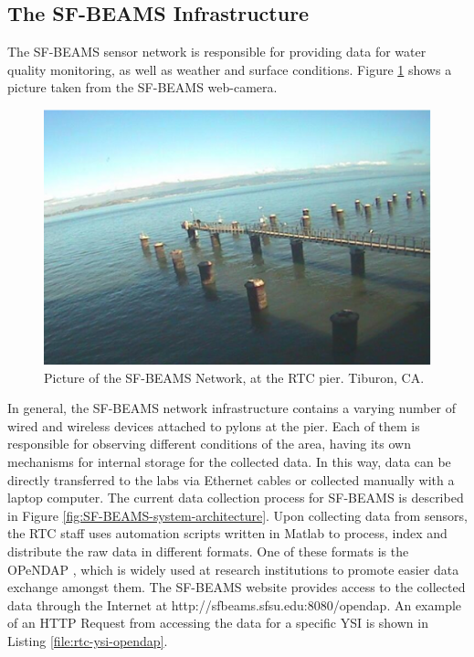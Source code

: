 \subsection{The SF-BEAMS Infrastructure}
\label{sec:sfbeams}

The SF-BEAMS sensor network is responsible for providing data for water quality
monitoring, as well as weather and surface conditions. Figure
\ref{fig:sf-beams} shows a picture taken from the SF-BEAMS web-camera.

\begin{figure}[!t]
  \centering
    \includegraphics[scale=0.7]{../diagrams/cam_image-oct15}
  \caption{Picture of the SF-BEAMS Network, at the RTC pier. Tiburon, CA.}
  \label{fig:sf-beams}
\end{figure}

In general, the SF-BEAMS network infrastructure contains a varying number of
wired and wireless devices attached to pylons at the pier. Each of them
is responsible for observing different conditions of the area, having its own
mechanisms for internal storage for the collected data. In this way, data can
be directly transferred to the labs via Ethernet cables or collected manually
with a laptop computer. The current data collection process for SF-BEAMS is
described in Figure
\ref{fig:SF-BEAMS-system-architecture}\cite{sfbeams-current-system}. Upon
collecting data from sensors, the RTC staff uses automation scripts written in
Matlab \cite{matlab} to process, index and distribute the raw data in
different formats. One of these formats is the OPeNDAP \cite{opendap}, which
is widely used at research institutions to promote easier data exchange
amongst them. The SF-BEAMS website provides access to the collected data through
the Internet at http://sfbeams.sfsu.edu:8080/opendap. An example of an HTTP
Request from accessing the data for a specific YSI \cite{YSI-Sonde} is shown in
Listing \ref{file:rtc-ysi-opendap}.

